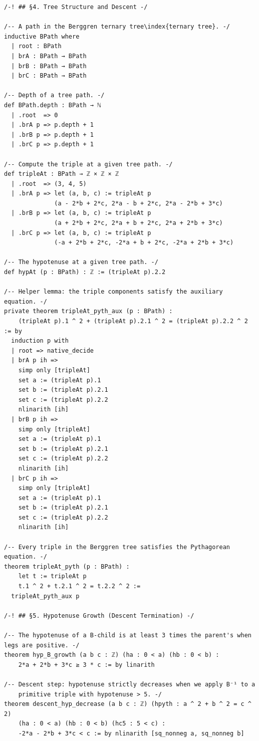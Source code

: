 \documentclass[11pt,openany]{book}
\theoremstyle{definition}
\theoremstyle{plain}
\theoremstyle{remark}
\begin{document}
\begin{lstlisting}[style=lean]
/-! ## §4. Tree Structure and Descent -/

/-- A path in the Berggren ternary tree\index{ternary tree}. -/
inductive BPath where
  | root : BPath
  | brA : BPath → BPath
  | brB : BPath → BPath
  | brC : BPath → BPath

/-- Depth of a tree path. -/
def BPath.depth : BPath → ℕ
  | .root  => 0
  | .brA p => p.depth + 1
  | .brB p => p.depth + 1
  | .brC p => p.depth + 1

/-- Compute the triple at a given tree path. -/
def tripleAt : BPath → ℤ × ℤ × ℤ
  | .root  => (3, 4, 5)
  | .brA p => let (a, b, c) := tripleAt p
              (a - 2*b + 2*c, 2*a - b + 2*c, 2*a - 2*b + 3*c)
  | .brB p => let (a, b, c) := tripleAt p
              (a + 2*b + 2*c, 2*a + b + 2*c, 2*a + 2*b + 3*c)
  | .brC p => let (a, b, c) := tripleAt p
              (-a + 2*b + 2*c, -2*a + b + 2*c, -2*a + 2*b + 3*c)

/-- The hypotenuse at a given tree path. -/
def hypAt (p : BPath) : ℤ := (tripleAt p).2.2

/-- Helper lemma: the triple components satisfy the auxiliary equation. -/
private theorem tripleAt_pyth_aux (p : BPath) :
    (tripleAt p).1 ^ 2 + (tripleAt p).2.1 ^ 2 = (tripleAt p).2.2 ^ 2 := by
  induction p with
  | root => native_decide
  | brA p ih =>
    simp only [tripleAt]
    set a := (tripleAt p).1
    set b := (tripleAt p).2.1
    set c := (tripleAt p).2.2
    nlinarith [ih]
  | brB p ih =>
    simp only [tripleAt]
    set a := (tripleAt p).1
    set b := (tripleAt p).2.1
    set c := (tripleAt p).2.2
    nlinarith [ih]
  | brC p ih =>
    simp only [tripleAt]
    set a := (tripleAt p).1
    set b := (tripleAt p).2.1
    set c := (tripleAt p).2.2
    nlinarith [ih]

/-- Every triple in the Berggren tree satisfies the Pythagorean equation. -/
theorem tripleAt_pyth (p : BPath) :
    let t := tripleAt p
    t.1 ^ 2 + t.2.1 ^ 2 = t.2.2 ^ 2 :=
  tripleAt_pyth_aux p

/-! ## §5. Hypotenuse Growth (Descent Termination) -/

/-- The hypotenuse of a B-child is at least 3 times the parent's when legs are positive. -/
theorem hyp_B_growth (a b c : ℤ) (ha : 0 < a) (hb : 0 < b) :
    2*a + 2*b + 3*c ≥ 3 * c := by linarith

/-- Descent step: hypotenuse strictly decreases when we apply B⁻¹ to a
    primitive triple with hypotenuse > 5. -/
theorem descent_hyp_decrease (a b c : ℤ) (hpyth : a ^ 2 + b ^ 2 = c ^ 2)
    (ha : 0 < a) (hb : 0 < b) (hc5 : 5 < c) :
    -2*a - 2*b + 3*c < c := by nlinarith [sq_nonneg a, sq_nonneg b]


\end{lstlisting}
\end{document}

